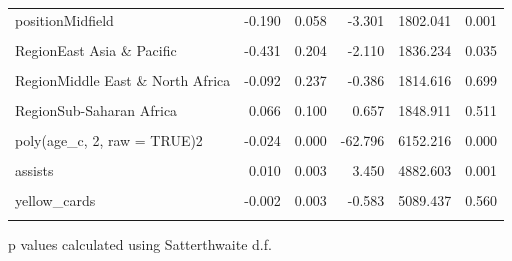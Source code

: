 \documentclass[
  12pt]{article}
\begin{document}
\begin{table}[!h]
\begin{threeparttable}
\begin{tabular}{lrrrrr}
positionMidfield & -0.190 & 0.058 & -3.301 & 1802.041 & 0.001\\
\cellcolor{gray!10}{citizen\_of\_club\_countryYes} & \cellcolor{gray!10}{-0.190} & \cellcolor{gray!10}{0.031} & \cellcolor{gray!10}{-6.039} & \cellcolor{gray!10}{6875.765} & \cellcolor{gray!10}{0.000}\\
RegionEast Asia \& Pacific & -0.431 & 0.204 & -2.110 & 1836.234 & 0.035\\
\addlinespace
\cellcolor{gray!10}{RegionLatin America \& Caribbean} & \cellcolor{gray!10}{0.191} & \cellcolor{gray!10}{0.061} & \cellcolor{gray!10}{3.133} & \cellcolor{gray!10}{1954.213} & \cellcolor{gray!10}{0.002}\\
RegionMiddle East \& North Africa & -0.092 & 0.237 & -0.386 & 1814.616 & 0.699\\
\cellcolor{gray!10}{RegionNorth America} & \cellcolor{gray!10}{-0.063} & \cellcolor{gray!10}{0.217} & \cellcolor{gray!10}{-0.292} & \cellcolor{gray!10}{1856.805} & \cellcolor{gray!10}{0.770}\\
RegionSub-Saharan Africa & 0.066 & 0.100 & 0.657 & 1848.911 & 0.511\\
\cellcolor{gray!10}{poly(age\_c, 2, raw = TRUE)1} & \cellcolor{gray!10}{0.019} & \cellcolor{gray!10}{0.004} & \cellcolor{gray!10}{4.988} & \cellcolor{gray!10}{2295.002} & \cellcolor{gray!10}{0.000}\\
\addlinespace
poly(age\_c, 2, raw = TRUE)2 & -0.024 & 0.000 & -62.796 & 6152.216 & 0.000\\
\cellcolor{gray!10}{goals} & \cellcolor{gray!10}{0.005} & \cellcolor{gray!10}{0.002} & \cellcolor{gray!10}{2.363} & \cellcolor{gray!10}{5169.192} & \cellcolor{gray!10}{0.018}\\
assists & 0.010 & 0.003 & 3.450 & 4882.603 & 0.001\\
\cellcolor{gray!10}{red\_cards} & \cellcolor{gray!10}{0.010} & \cellcolor{gray!10}{0.022} & \cellcolor{gray!10}{0.428} & \cellcolor{gray!10}{4678.452} & \cellcolor{gray!10}{0.669}\\
yellow\_cards & -0.002 & 0.003 & -0.583 & 5089.437 & 0.560\\
\addlinespace
\cellcolor{gray!10}{minutes\_played} & \cellcolor{gray!10}{0.353} & \cellcolor{gray!10}{0.013} & \cellcolor{gray!10}{26.260} & \cellcolor{gray!10}{5243.836} & \cellcolor{gray!10}{0.000}\\
\bottomrule
\end{tabular}
\begin{tablenotes}
\item  p values calculated using Satterthwaite d.f. 

\end{tablenotes}
\end{threeparttable}
\end{table}
\end{document}
